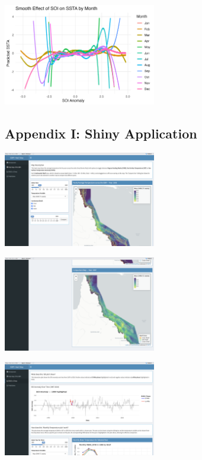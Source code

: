 \documentclass[letterpaper,9pt,twocolumn,twoside,]{pinp}
\begin{document}
\begin{center}
\includegraphics[width=0.5\textwidth]{report_images/soi_month_ssta.png}
\end{center}

\subsection{Appendix I: Shiny
Application}\label{appendix-i-shiny-application}

\begin{center}
\includegraphics[width=0.5\textwidth]{report_images/shiny_map_a.png}
\end{center}

\begin{center}
\includegraphics[width=0.5\textwidth]{report_images/shiny_map_b.png}
\end{center}

\begin{center}
\includegraphics[width=0.5\textwidth]{report_images/shiny_enso_temp_a.png}
\end{center}
\end{document}
